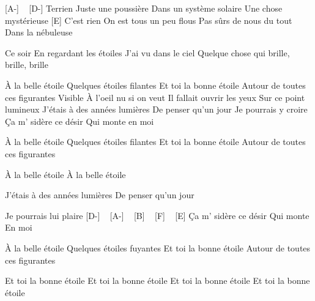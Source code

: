 [A-] ~ [D-]
Terrien
Juste une poussière
Dans un système solaire
Une chose mystérieuse [E]
C'est rien
On est tous un peu flous
Pas sûrs de nous du tout
Dans la nébuleuse

Ce soir
En regardant les étoiles
J'ai vu dans le ciel
Quelque chose qui brille, brille, brille

À la belle étoile
Quelques étoiles filantes
Et toi la bonne étoile
Autour de toutes ces figurantes
Visible
À l'oeil nu si on veut
Il fallait ouvrir les yeux
Sur ce point lumineux
J'étais à des années lumières
De penser qu'un jour
Je pourrais y croire
Ça m' sidère ce désir
Qui monte en moi

À la belle étoile
Quelques étoiles filantes
Et toi la bonne étoile
Autour de toutes ces figurantes

À la belle étoile
À la belle étoile

J'étais à des années lumières
De penser qu'un jour

Je pourrais lui plaire
[D-] ~ [A-] ~ [B] ~ [F] ~ [E]
Ça m' sidère ce désir
Qui monte
En moi

À la belle étoile
Quelques étoiles fuyantes
Et toi la bonne étoile
Autour de toutes ces figurantes

Et toi la bonne étoile
Et toi la bonne étoile
Et toi la bonne étoile
Et toi la bonne étoile 